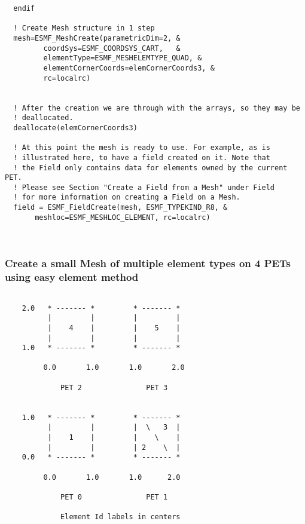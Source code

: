 \begin{verbatim}
  endif
  
  ! Create Mesh structure in 1 step
  mesh=ESMF_MeshCreate(parametricDim=2, &
         coordSys=ESMF_COORDSYS_CART,   &
         elementType=ESMF_MESHELEMTYPE_QUAD, &
         elementCornerCoords=elemCornerCoords3, &
         rc=localrc)


  ! After the creation we are through with the arrays, so they may be
  ! deallocated.
  deallocate(elemCornerCoords3)

  ! At this point the mesh is ready to use. For example, as is 
  ! illustrated here, to have a field created on it. Note that 
  ! the Field only contains data for elements owned by the current PET.
  ! Please see Section "Create a Field from a Mesh" under Field
  ! for more information on creating a Field on a Mesh. 
  field = ESMF_FieldCreate(mesh, ESMF_TYPEKIND_R8, &
       meshloc=ESMF_MESHLOC_ELEMENT, rc=localrc)

 
\end{verbatim}
 

  \subsubsection{Create a small Mesh of multiple element types on 4 PETs using easy element method}
  \label{sec:mesh:4pet1stepee}
  \begin{minipage}{\linewidth} 
  \begin{verbatim}
  
    2.0   * ------- *         * ------- *          
          |         |         |         |
          |    4    |         |    5    |
          |         |         |         |
    1.0   * ------- *         * ------- *
          
         0.0       1.0       1.0       2.0
  
             PET 2               PET 3
  
  
    1.0   * ------- *         * ------- *
          |         |         |  \   3  |
          |    1    |         |    \    |
          |         |         | 2    \  |
    0.0   * ------- *         * ------- *
  
         0.0       1.0       1.0      2.0 
   
             PET 0               PET 1
  
             Element Id labels in centers
  
  \end{verbatim}
  \end{minipage}
   
